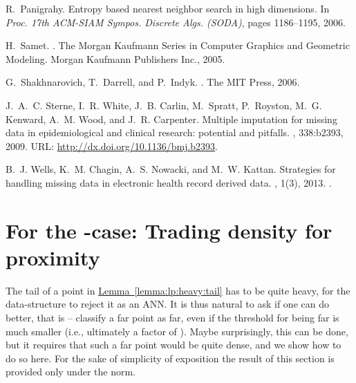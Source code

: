 \documentclass[12pt]{article}\usepackage[cm]{fullpage}
\newcommand{\Term}[1]{\textsf{#1}}
\theoremstyle{remark}\theoremheaderfont{\sf}\theorembodyfont{\upshape}\newtheorem{defn}[theorem]{Definition}
\numberwithin{figure}{section}\numberwithin{table}{section}\numberwithin{equation}{section}
\newcommand{\HLink}[2]{\hyperref[#2]{#1~\ref*{#2}}}
\newcommand{\apndlab}[1]{\label{apnd:#1}}
\newcommand{\lemref}[1]{\HLink{Lemma}{lemma:#1}}
\newcommand{\ANN}{\Term{ANN}\xspace}\newcommand{\NN}{\Term{NN}\xspace}
\begin{document}
\begin{thebibliography}{CLMW11}
R.~Panigrahy.
\newblock Entropy based nearest neighbor search in high dimensions.
\newblock In {\em Proc. 17th ACM-SIAM Sympos. Discrete Algs. {\em(SODA)}},
  pages 1186--1195, 2006.

H.~Samet.
.
\newblock The Morgan Kaufmann Series in Computer Graphics and Geometric
  Modeling. Morgan Kaufmann Publishers Inc., 2005.

G.~Shakhnarovich, T.~Darrell, and P.~Indyk.
.
\newblock The MIT Press, 2006.

J.~A.~C. Sterne, I.~R. White, J.~B. Carlin, M.~Spratt, P.~Royston, M.~G.
  Kenward, A.~M. Wood, and J.~R. Carpenter.
\newblock Multiple imputation for missing data in epidemiological and clinical
  research: potential and pitfalls.
, 338:b2393, 2009.
\newblock URL: \url{http://dx.doi.org/10.1136/bmj.b2393}.

B.~J. Wells, K.~M. Chagin, A.~S. Nowacki, and M.~W. Kattan.
\newblock Strategies for handling missing data in electronic health record
  derived data.
, 1(3), 2013.
\newblock \href {http://dx.doi.org/10.13063/2327-9214.1035}
  {}.

\end{thebibliography}



 



\appendix

\section{For the -case: Trading density for proximity}
\apndlab{eps:approx}

The tail of a point in \lemref{lp:heavy:tail} has to be quite heavy,
for the data-structure to reject it as an \ANN. It is thus natural to
ask if one can do better, that is -- classify a far point as far, even
if the threshold for being far is much smaller (i.e., ultimately a
factor of ).  Maybe surprisingly, this can be done, but it
requires that such a far point would be quite dense, and we show how
to do so here. For the sake of simplicity of exposition the result of
this section is provided only under the  norm.
\end{document}
